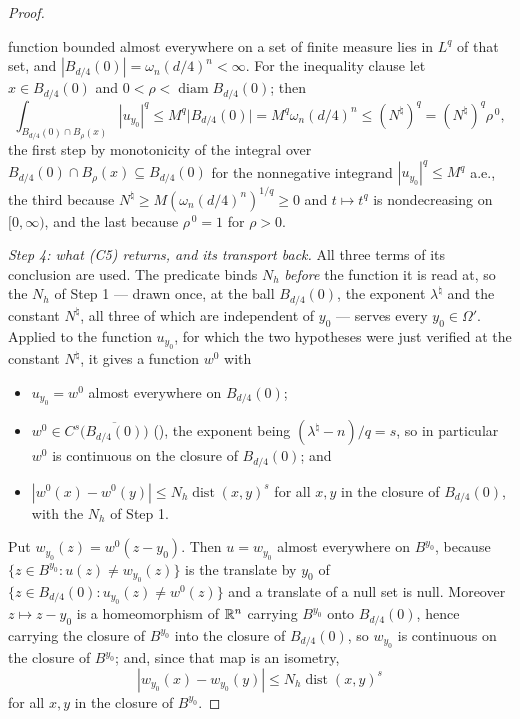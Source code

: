 \begin{proof}
\begin{itemize}
  function bounded almost everywhere on a set of finite measure lies in $L^q$ of
  that set, and $|B_{d/4}(0)|=\omega_n(d/4)^n<\infty$.  For the inequality
  clause let $x\in B_{d/4}(0)$ and $0<\rho<\operatorname{diam}B_{d/4}(0)$; then
  \[
  \int_{B_{d/4}(0)\cap B_\rho(x)}|u_{y_0}|^q
  \le M^q\bigl|B_{d/4}(0)\bigr|=M^q\omega_n(d/4)^n
  \le(N^\natural)^q=(N^\natural)^q\rho^{\,0},
  \]
  the first step by monotonicity of the integral over
  $B_{d/4}(0)\cap B_\rho(x)\subseteq B_{d/4}(0)$ for the nonnegative integrand
  $|u_{y_0}|^q\le M^q$ a.e., the third because
  $N^\natural\ge M(\omega_n(d/4)^n)^{1/q}\ge0$ and $t\mapsto t^q$ is
  nondecreasing on $[0,\infty)$, and the last because $\rho^{\,0}=1$ for
  $\rho>0$.
\end{itemize}

\emph{Step 4: what \textup{(C5)} returns, and its transport back.}  All three
terms of its conclusion are used.  The predicate binds $N_h$ \emph{before} the
function it is read at, so the $N_h$ of Step 1 --- drawn once, at the ball
$B_{d/4}(0)$, the exponent $\lambda^\natural$ and the constant $N^\natural$, all
three of which are independent of $y_0$ --- serves every $y_0\in\Omega'$.
Applied to the function $u_{y_0}$, for which the two hypotheses were just
verified at the constant $N^\natural$, it gives a function $w^0$ with
\begin{itemize}
\item $u_{y_0}=w^0$ almost everywhere on $B_{d/4}(0)$;
\item $w^0\in C^{s}\bigl(\overline{B_{d/4}(0)}\bigr)$ (),
  the exponent being $(\lambda^\natural-n)/q=s$, so in particular $w^0$ is
  continuous on the closure of $B_{d/4}(0)$; and
\item $|w^0(x)-w^0(y)|\le N_h\operatorname{dist}(x,y)^{s}$ for all
  $x,y$ in the closure of $B_{d/4}(0)$, with the $N_h$ of Step 1.
\end{itemize}
Put $w_{y_0}(z)=w^0(z-y_0)$.  Then $u=w_{y_0}$ almost everywhere on $B^{y_0}$,
because $\{z\in B^{y_0}:u(z)\ne w_{y_0}(z)\}$ is the translate by $y_0$ of
$\{z\in B_{d/4}(0):u_{y_0}(z)\ne w^0(z)\}$ and a translate of a null set is
null.  Moreover $z\mapsto z-y_0$ is a homeomorphism of $\mathbb{R}^n$ carrying
$B^{y_0}$ onto $B_{d/4}(0)$, hence carrying the closure of $B^{y_0}$ into the
closure of $B_{d/4}(0)$, so $w_{y_0}$ is continuous on the closure of
$B^{y_0}$; and, since that map is an isometry,
\[
|w_{y_0}(x)-w_{y_0}(y)|\le N_h\operatorname{dist}(x,y)^{s}
\]
for all $x,y$ in the closure of $B^{y_0}$.


\end{proof}
